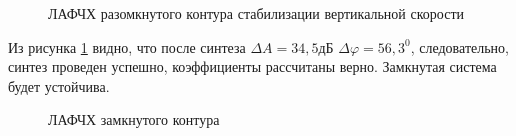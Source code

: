 \begin{figure}[H]
    \caption{ЛАФЧХ разомкнутого контура стабилизации вертикальной скорости}
    \label{fig:Вертикальная скорость раз qMAX}
\end{figure}

Из рисунка \ref{fig:Вертикальная скорость раз qMAX} видно, что после синтеза $\Delta A = 34,5 $дБ $\Delta \varphi = 56,3^0$, следовательно, синтез проведен успешно, коэффициенты рассчитаны верно. Замкнутая система будет устойчива.  

\begin{figure}[H]
    \caption{ЛАФЧХ замкнутого контура }
    \label{fig:Вертикальная скорость зам qMAX}
\end{figure}


